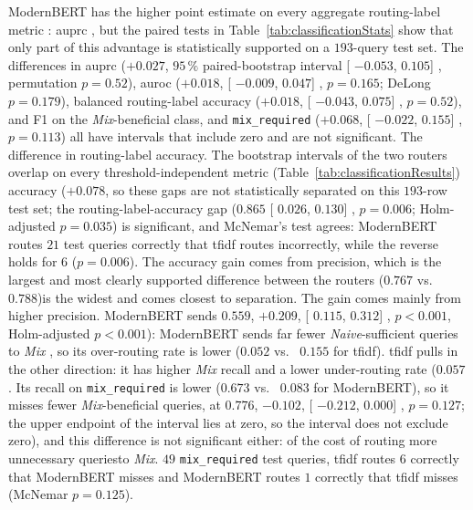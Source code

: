 \documentclass[english, bibtex]{kththesis}               %
\numberwithin{listing}{chapter}
\providecommand{\DIFaddtex}[1]{{\protect\color{blue} \sf #1}} %
\providecommand{\DIFdeltex}[1]{{\protect\color{red} \scriptsize #1}} %
\providecommand{\DIFaddbegin}{} %
\providecommand{\DIFaddend}{} %
\providecommand{\DIFdelbegin}{} %
\providecommand{\DIFdelend}{} %
\providecommand{\DIFadd}[1]{\texorpdfstring{\DIFaddtex{#1}}{#1}} %
\providecommand{\DIFdel}[1]{\texorpdfstring{\DIFdeltex{#1}}{}} %
\begin{document}
\DIFadd{ModernBERT has the higher point estimate }\DIFaddend on every aggregate routing-label metric\DIFdelbegin \DIFdel{: \gls{auprc} }\DIFdelend \DIFaddbegin \DIFadd{, but the paired tests in Table~\ref{tab:classificationStats} show that only part of this advantage is statistically supported on a $193$-query test set. The differences in \gls{auprc} ($+0.027$, $95\,\%$ paired-bootstrap interval }[\DIFadd{$-0.053$}\DIFaddend , \DIFaddbegin \DIFadd{$0.105$}]\DIFadd{, permutation $p = 0.52$), \gls{auroc} ($+0.018$, }[\DIFadd{$-0.009$, $0.047$}]\DIFadd{, $p = 0.165$; DeLong $p = 0.179$), }\DIFaddend balanced routing-label accuracy \DIFaddbegin \DIFadd{($+0.018$, }[\DIFadd{$-0.043$}\DIFaddend , \DIFaddbegin \DIFadd{$0.075$}]\DIFadd{, $p = 0.52$), and }\DIFaddend F1 on \DIFdelbegin \DIFdel{the \emph{Mix}-beneficial class, and }\DIFdelend \DIFaddbegin \DIFadd{\texttt{mix\_required} ($+0.068$, }[\DIFadd{$-0.022$, $0.155$}]\DIFadd{, $p = 0.113$) all have intervals that include zero and are not significant. The difference in }\DIFaddend routing-label \DIFdelbegin \DIFdel{accuracy. The bootstrap intervals of the two routers overlap on every threshold-independent metric (Table~\ref{tab:classificationResults}) }\DIFdelend \DIFaddbegin \DIFadd{accuracy ($+0.078$}\DIFaddend , \DIFdelbegin \DIFdel{so these gaps are not statistically separated on this $193$-row test set; the routing-label-accuracy gap ($0.865$ }\DIFdelend \DIFaddbegin [\DIFadd{$0.026$, $0.130$}]\DIFadd{, $p = 0.006$; Holm-adjusted $p = 0.035$) is significant, and McNemar's test agrees: ModernBERT routes $21$ test queries correctly that \gls{tfidf} routes incorrectly, while the reverse holds for $6$ ($p = 0.006$). The accuracy gain comes from precision, which is the largest and most clearly supported difference between the routers ($0.767$ }\DIFaddend vs.\ \DIFdelbegin \DIFdel{$0.788$)is the widest and comes closest to separation. The gain comes mainly from higher precision. ModernBERT sends }\DIFdelend \DIFaddbegin \DIFadd{$0.559$, $+0.209$, }[\DIFadd{$0.115$, $0.312$}]\DIFadd{, $p < 0.001$, Holm-adjusted $p < 0.001$): ModernBERT sends far }\DIFaddend fewer \emph{Naive}-sufficient queries to \emph{Mix}\DIFdelbegin \DIFdel{, so its over-routing rate is lower ($0.052$ vs. \ $0.155$ for \gls{tfidf}). \gls{tfidf} pulls in the other direction: it has higher \emph{Mix} recall and a lower under-routing rate ($0.057$ }\DIFdelend \DIFaddbegin \DIFadd{. Its recall on \texttt{mix\_required} is lower ($0.673$ }\DIFaddend vs.\ \DIFdelbegin \DIFdel{$0.083$ for ModernBERT), so it misses fewer \emph{Mix}-beneficial queries, at }\DIFdelend \DIFaddbegin \DIFadd{$0.776$, $-0.102$, }[\DIFadd{$-0.212$, $0.000$}]\DIFadd{, $p = 0.127$; the upper endpoint of the interval lies at zero, so the interval does not exclude zero), and this difference is not significant either: of }\DIFaddend the \DIFdelbegin \DIFdel{cost of routing more unnecessary queriesto \emph{Mix}.
}\DIFdelend \DIFaddbegin \DIFadd{$49$ \texttt{mix\_required} test queries, \gls{tfidf} routes $6$ correctly that ModernBERT misses and ModernBERT routes $1$ correctly that \gls{tfidf} misses (McNemar $p = 0.125$).
}
\end{document}

